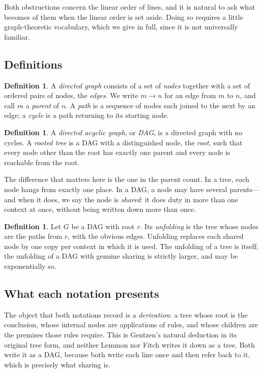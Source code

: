 \documentclass[11pt]{article}
\theoremstyle{plain}
\theoremstyle{definition}
\newtheorem{definition}[theorem]{Definition}
\theoremstyle{remark}
\begin{document}
Both obstructions concern the linear order of lines, and it is natural to ask
what becomes of them when the linear order is set aside. Doing so requires a
little graph-theoretic vocabulary, which we give in full, since it is not
universally familiar.

\subsection{Definitions}

\begin{definition}
A \emph{directed graph} consists of a set of \emph{nodes} together with a set
of ordered pairs of nodes, the \emph{edges}. We write $m \to n$ for an edge
from $m$ to $n$, and call $m$ a \emph{parent} of $n$. A \emph{path} is a
sequence of nodes each joined to the next by an edge; a \emph{cycle} is a path
returning to its starting node.
\end{definition}

\begin{definition}
A \emph{directed acyclic graph}, or \emph{DAG}, is a directed graph with no
cycles. A \emph{rooted tree} is a DAG with a distinguished node, the
\emph{root}, such that every node other than the root has exactly one parent
and every node is reachable from the root.
\end{definition}

The difference that matters here is the one in the parent count. In a tree,
each node hangs from exactly one place. In a DAG, a node may have several
parents---and when it does, we say the node is \emph{shared}: it does duty in
more than one context at once, without being written down more than once.

\begin{definition}
Let $G$ be a DAG with root $r$. Its \emph{unfolding} is the tree whose nodes
are the paths from $r$, with the obvious edges. Unfolding replaces each shared
node by one copy per context in which it is used. The unfolding of a tree is
itself; the unfolding of a DAG with genuine sharing is strictly larger, and
may be exponentially so.
\end{definition}

\subsection{What each notation presents}

The object that both notations record is a \emph{derivation}: a tree whose
root is the conclusion, whose internal nodes are applications of rules, and
whose children are the premises those rules require. This is Gentzen's
natural deduction in its original tree form, and neither Lemmon nor Fitch
writes it down as a tree. Both write it as a DAG, because both write each line
once and then refer back to it, which is precisely what sharing is.
\end{document}

